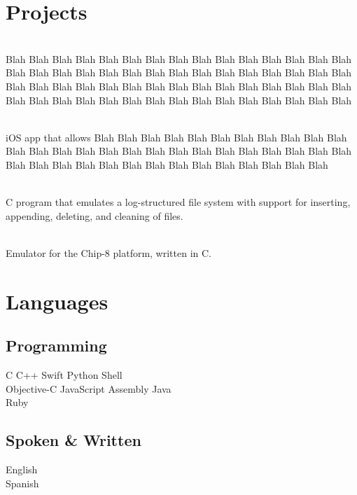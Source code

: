 \documentclass[]{deedy-resume-openfont}
\begin{document}

\section{Projects}
 \\
Blah Blah Blah Blah Blah Blah Blah Blah Blah Blah Blah Blah Blah Blah Blah Blah Blah Blah Blah Blah Blah Blah Blah Blah Blah Blah Blah Blah Blah Blah Blah Blah Blah Blah Blah Blah Blah Blah Blah Blah Blah Blah Blah Blah Blah Blah Blah Blah Blah Blah Blah Blah Blah Blah Blah Blah Blah Blah Blah Blah
\sectionsep

 \\
iOS app that allows Blah Blah Blah Blah Blah Blah Blah Blah Blah Blah Blah Blah Blah Blah Blah Blah Blah Blah Blah Blah Blah Blah Blah Blah Blah Blah Blah Blah Blah Blah Blah Blah Blah Blah Blah Blah Blah Blah Blah Blah

 \\
C program that emulates a log-structured file system with support for inserting, appending, deleting, and cleaning of files.
\sectionsep

 \\
Emulator for the Chip-8 platform, written in C.
\sectionsep

\section{Languages}
\begin{minipage}[t]{.6\textwidth}
\subsection{Programming}
C \textbullet{} C++ \textbullet{} Swift \textbullet{} Python \textbullet{} Shell \\
Objective-C \textbullet{} JavaScript \textbullet{} Assembly \textbullet{} Java\\
Ruby
\sectionsep
\end{minipage}
\hfill
\begin{minipage}[t]{.35\textwidth}
\subsection{Spoken \& Written}
 English\\
 Spanish\\
\end{minipage}
\end{document}
